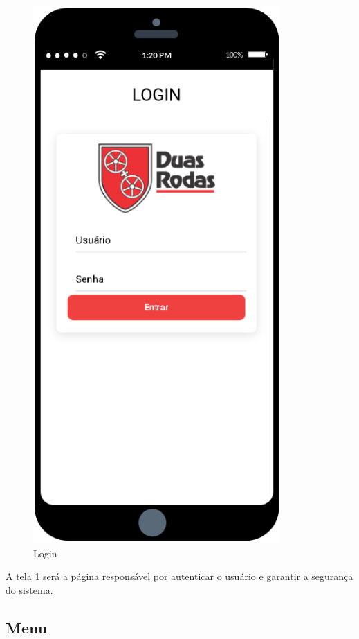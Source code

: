{\begin{figure}[htb]
	\caption{\label{mobile_login}Login}
	\begin{center}
		\includegraphics[scale=0.80]{./Figuras/mobile/login.png}
	\end{center}
\end{figure}

A tela \ref{mobile_login} será a página responsável por autenticar o usuário e garantir a segurança do sistema.

\newpage
\subsection{Menu}

}
